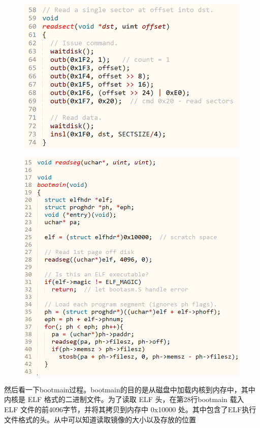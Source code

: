 \documentclass[a4paper,12pt]{report}
\begin{document}
\begin{figure}[H]
	\centering
	\includegraphics [width=1.0\textwidth]{figure//image94.png}
\end{figure}
\begin{figure}[H]
	\centering
	\includegraphics [width=1.0\textwidth]{figure//image95.png}
\end{figure}
然后看一下bootmain过程。bootmain的目的是从磁盘中加载内核到内存中，其中内核是 ELF 格式的二进制文件。为了读取 ELF 头，在第28行bootmain 载入 ELF 文件的前4096字节，并将其拷贝到内存中 0x10000 处。其中包含了ELF执行文件格式的头。从中可以知道读取镜像的大小以及存放的位置
\end{document}
